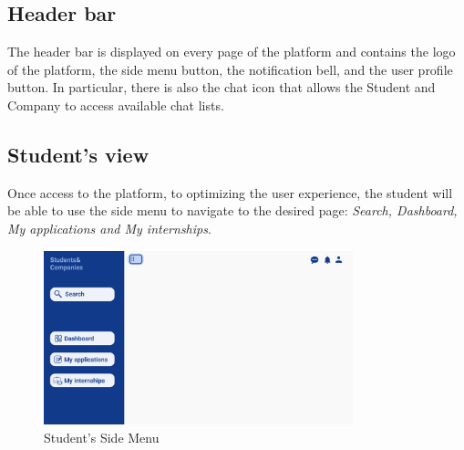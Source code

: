 \subsection{Header bar}
The header bar is displayed on every page of the platform and contains the logo of the platform, 
the side menu button, the notification bell, and the user profile button. In particular, there 
is also the chat icon that allows the Student and Company to access available chat lists.

\subsection{Student's view}
Once access to the platform, to optimizing the user experience, the student will be able to use the side menu to navigate to the desired page:
\textit{Search, Dashboard, My applications and My internships}.
\begin{figure}[H]
    \centering
    \includegraphics[width=0.8\textwidth]{Images/UI/Layout-Student.png}
    \caption{Student's Side Menu}\label{fig:Student_view}
\end{figure}
